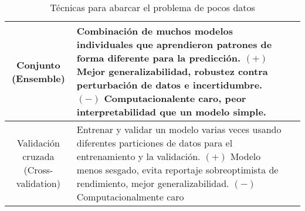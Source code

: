 \begin{center}
\begin{table}[h!]
\begin{tabular}{ |c|m{9.5cm}|c| }
            \hline
            Conjunto (Ensemble) & Combinación de muchos modelos individuales que aprendieron patrones de forma
            diferente para la predicción. $(+)$ Mejor generalizabilidad, robustez contra perturbación de datos e
            incertidumbre. $(-)$ Computacionalente caro, peor interpretabilidad que un modelo simple. &
            \autocite{safonova-2023,langkvist-2016,pritt-2017} \\
            \hline
            \makecell{Validación cruzada \\ (Cross-validation)} & Entrenar y validar un modelo varias veces usando
            diferentes particiones de datos para el entrenamiento y la validación. $(+)$ Modelo menos sesgado, evita
            reportaje sobreoptimista de rendimiento, mejor generalizabilidad. $(-)$ Computacionalmente caro &
            \autocite{safonova-2023} \\
            \hline
        \end{tabular}
        \caption{Técnicas para abarcar el problema de pocos datos}
        \label{table:3}
    \end{table}
    \vspace{-\topsep}
\end{center}


